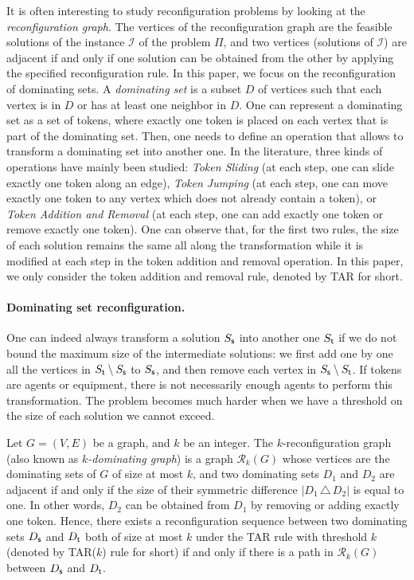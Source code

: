 \documentclass[10pt]{article}
\newcommand{\source}{{\sf s}}
\newcommand{\target}{{\sf t}}
\begin{document}
\medskip
It is often interesting to study reconfiguration problems by looking at the {\em reconfiguration graph}. The vertices of the reconfiguration graph are the feasible solutions of the instance $\mathcal{I}$ of the problem $\Pi$, and two vertices (solutions of $\mathcal{I}$) are adjacent if and only if one solution can be obtained from the other by applying the specified reconfiguration rule. In this paper, we focus on the reconfiguration of dominating sets. A \emph{dominating set} is a subset $D$ of vertices such that each vertex is in $D$ or has at least one neighbor in $D$. One can represent a dominating set as a set of tokens, where exactly one token is placed on each vertex that is part of the dominating set. Then, one needs to define an operation that allows to transform a dominating set into another one. In the literature, three kinds of operations have mainly been studied: {\em Token Sliding} (at each step, one can slide exactly one token along an edge), {\em Token Jumping} (at each step, one can move exactly one token to any vertex which does not already contain a token), or {\em Token Addition and Removal} (at each step, one can add exactly one token or remove exactly one token).
One can observe that, for the first two rules, the size of each solution remains the same all along the transformation while it is modified at each step in the token addition and removal operation. 
In this paper, we only consider the token addition and removal rule, denoted by {\sf TAR} for short. 

\paragraph{Dominating set reconfiguration.}
One can indeed always transform a solution $S_\source$ into another one $S_\target$ if we do not bound the maximum size of the intermediate solutions: we first add one by one all the vertices in $S_\target \setminus S_\source$ to $S_\source$, and then remove each vertex in $S_\source \setminus S_\target$. If tokens are agents or equipment, there is not necessarily enough agents to perform this transformation. The problem becomes much harder when we have a threshold on the size of each solution we cannot exceed. 

Let $G=(V,E)$ be a graph, and $k$ be an integer. The $k$-reconfiguration graph (also known as {\em $k$-dominating graph}) is a graph $\mathcal{R}_k(G)$ whose vertices are the dominating sets of $G$ of size at most $k$, and two dominating sets $D_1$ and $D_2$ are adjacent if and only if the size of their symmetric difference $|D_1 \, \triangle \, D_2|$ is equal to one. In other words, $D_2$ can be obtained from $D_1$ by removing or adding exactly one token. Hence, there exists a reconfiguration sequence between two dominating sets  $D_\source$ and $D_\target$ both of size at most $k$ under the {\sf TAR} rule with threshold $k$ (denoted by {\sf TAR}($k$) rule for short) if and only if there is a path in $\mathcal{R}_k(G)$ between $D_\source$ and $D_\target$.  
\end{document}
